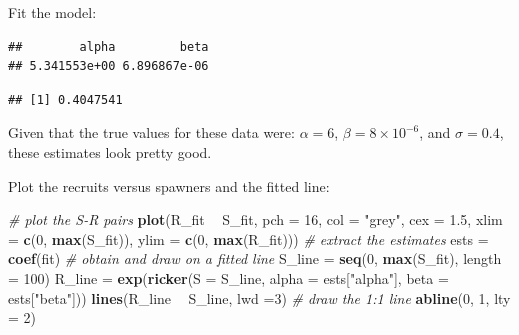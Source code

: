\documentclass[]{book}
\newenvironment{Shaded}{\begin{snugshade}}{\end{snugshade}}
\newcommand{\CommentTok}[1]{\textcolor[rgb]{0.56,0.35,0.01}{\textit{#1}}}
\newcommand{\DataTypeTok}[1]{\textcolor[rgb]{0.13,0.29,0.53}{#1}}
\newcommand{\DecValTok}[1]{\textcolor[rgb]{0.00,0.00,0.81}{#1}}
\newcommand{\FloatTok}[1]{\textcolor[rgb]{0.00,0.00,0.81}{#1}}
\newcommand{\KeywordTok}[1]{\textcolor[rgb]{0.13,0.29,0.53}{\textbf{#1}}}
\newcommand{\NormalTok}[1]{#1}
\newcommand{\OperatorTok}[1]{\textcolor[rgb]{0.81,0.36,0.00}{\textbf{#1}}}
\newcommand{\StringTok}[1]{\textcolor[rgb]{0.31,0.60,0.02}{#1}}
\begin{document}
Fit the model:

\begin{Shaded}
\end{Shaded}

\begin{verbatim}
##        alpha         beta 
## 5.341553e+00 6.896867e-06
\end{verbatim}

\begin{verbatim}
## [1] 0.4047541
\end{verbatim}

Given that the true values for these data were: \(\alpha = 6\), \(\beta = 8\times10^{-6}\), and \(\sigma = 0.4\), these estimates look pretty good.

Plot the recruits versus spawners and the fitted line:

\begin{Shaded}
\begin{Highlighting}[]
\CommentTok{# plot the S-R pairs}
\KeywordTok{plot}\NormalTok{(R_fit }\OperatorTok{~}\StringTok{ }\NormalTok{S_fit, }\DataTypeTok{pch =} \DecValTok{16}\NormalTok{, }\DataTypeTok{col =} \StringTok{"grey"}\NormalTok{, }\DataTypeTok{cex =} \FloatTok{1.5}\NormalTok{,}
     \DataTypeTok{xlim =} \KeywordTok{c}\NormalTok{(}\DecValTok{0}\NormalTok{, }\KeywordTok{max}\NormalTok{(S_fit)), }\DataTypeTok{ylim =} \KeywordTok{c}\NormalTok{(}\DecValTok{0}\NormalTok{, }\KeywordTok{max}\NormalTok{(R_fit)))}
\CommentTok{# extract the estimates}
\NormalTok{ests =}\StringTok{ }\KeywordTok{coef}\NormalTok{(fit)}
\CommentTok{# obtain and draw on a fitted line}
\NormalTok{S_line =}\StringTok{ }\KeywordTok{seq}\NormalTok{(}\DecValTok{0}\NormalTok{, }\KeywordTok{max}\NormalTok{(S_fit), }\DataTypeTok{length =} \DecValTok{100}\NormalTok{)}
\NormalTok{R_line =}\StringTok{ }\KeywordTok{exp}\NormalTok{(}\KeywordTok{ricker}\NormalTok{(}\DataTypeTok{S =}\NormalTok{ S_line,}
                \DataTypeTok{alpha =}\NormalTok{ ests[}\StringTok{"alpha"}\NormalTok{],}
                \DataTypeTok{beta =}\NormalTok{ ests[}\StringTok{"beta"}\NormalTok{]))}
\KeywordTok{lines}\NormalTok{(R_line }\OperatorTok{~}\StringTok{ }\NormalTok{S_line, }\DataTypeTok{lwd =}\DecValTok{3}\NormalTok{)}
\CommentTok{# draw the 1:1 line}
\KeywordTok{abline}\NormalTok{(}\DecValTok{0}\NormalTok{, }\DecValTok{1}\NormalTok{, }\DataTypeTok{lty =} \DecValTok{2}\NormalTok{)}
\end{Highlighting}
\end{Shaded}
\end{document}
